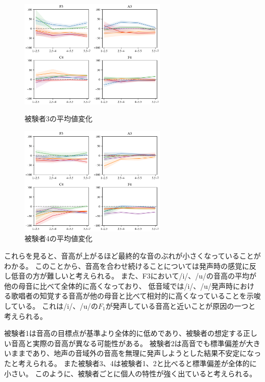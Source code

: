 \documentclass[10.5ptj,a4j,dvipdfmx,uplatex, oneside, openany, report, draft]{jsbook}%
\begin{document}
\begin{figure}[htbp]
    \begin{minipage}{0.5\hsize}
        \begin{center}
            \includegraphics[clip,width=7.0cm]{long_mean_3.png}
          \end{center}
     \caption{被験者3の平均値変化}
     \label{long_mean_3}
    \end{minipage}
    \begin{minipage}{0.5\hsize}
        \begin{center}
            \includegraphics[clip,width=7.0cm]{long_mean_4.png}
          \end{center}
     \caption{被験者4の平均値変化}
     \label{long_mean_4}
    \end{minipage}
\end{figure}

これらを見ると、音高が上がるほど最終的な音のぶれが小さくなっていることがわかる。
このことから、音高を合わせ続けることについては発声時の感覚に反し低音の方が難しいと考えられる。
また、F3において/i/、/u/の音高の平均が他の母音に比べて全体的に高くなっており、
低音域では/i/、/u/発声時における歌唱者の知覚する音高が他の母音と比べて相対的に高くなっていることを示唆している。
これは/i/、/u/の$F_1$が発声している音高と近いことが原因の一つと考えられる。

被験者1は音高の目標点が基準より全体的に低めであり、被験者の想定する正しい音高と実際の音高が異なる可能性がある。
被験者2は高音でも標準偏差が大きいままであり、地声の音域外の音高を無理に発声しようとした結果不安定になったと考えられる。
また被験者3、4は被験者1、2と比べると標準偏差が全体的に小さい。
このように、被験者ごとに個人の特性が強く出ていると考えられる。
\end{document}
